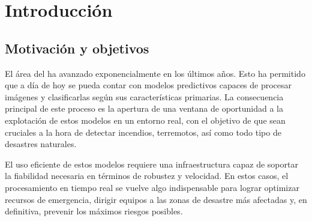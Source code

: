 \cleardoublepage
\chapter{Introducción}
\label{ch:chapter1}


\section{Motivación y objetivos}\label{sec:motivación-y-objetivos}

El área del \cite{deep_learning} ha avanzado exponencialmente en los últimos años.
Esto ha permitido que a día de hoy se pueda contar con modelos predictivos capaces de procesar imágenes y clasificarlas según sus características primarias.
La consecuencia principal de este proceso es la apertura de una ventana de oportunidad a la explotación de estos modelos en un entorno real, con el objetivo de que sean cruciales a
la hora de detectar incendios, terremotos, así como todo tipo de desastres naturales.


El uso eficiente de estos modelos requiere una infraestructura capaz de soportar la fiabilidad necesaria en términos de robustez y velocidad.
En estos casos, el procesamiento en tiempo real se vuelve algo indispensable para lograr optimizar recursos de emergencia, dirigir equipos a las zonas de desastre más afectadas y, en definitiva, prevenir los máximos riesgos posibles.


